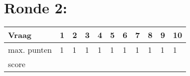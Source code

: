 \begin{center}
\end{center}
\vspace{5mm}
 
 
\vspace{5mm}
 
\section{Ronde 2:}
\begin{questions}

\end{questions}
\begin{table}[!b]
\centering
\begin{tabular}{|l|l|l|l|l|l|l|l|l|l|l|}
\hline
Vraag       & 1 & 2 & 3 & 4 & 5 & 6 & 7 & 8 & 9 & 10 \\ \hline
max. punten & 1 & 1 & 1 & 1 & 1 & 1 & 1 & 1 & 1 & 1  \\ \hline
score       &   &   &   &   &   &   &   &   &   &    \\ \hline
\end{tabular}
\end{table}
\newpage